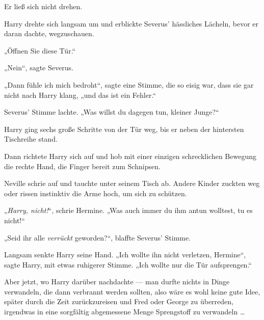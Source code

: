 Er ließ sich nicht drehen.

Harry drehte sich langsam um und erblickte Severus’ hässliches Lächeln, bevor er daran dachte, wegzuschauen.

„Öffnen Sie diese Tür.“

„Nein“, sagte Severus.

„Dann fühle ich mich bedroht“, sagte eine Stimme, die so eisig war, dass sie gar nicht nach Harry klang, „und das ist ein Fehler.“

Severus’ Stimme lachte.
„Was willst du dagegen tun, kleiner Junge?“

Harry ging sechs große Schritte von der Tür weg, bis er neben der hintersten Tischreihe stand.

Dann richtete Harry sich auf und hob mit einer einzigen schrecklichen Bewegung die rechte Hand, die Finger bereit zum Schnipsen.

Neville schrie auf und tauchte unter seinem Tisch ab. Andere Kinder zuckten weg oder rissen instinktiv die Arme hoch, um sich zu schützen.

„\emph{Harry, nicht!}“, schrie Hermine.
„Was auch immer du ihm antun wolltest, tu es nicht!“

„Seid ihr alle \emph{verrückt} geworden?“, blaffte Severus’ Stimme.

Langsam senkte Harry seine Hand.
„Ich wollte ihn nicht verletzen, Hermine“, sagte Harry, mit etwas ruhigerer Stimme.
„Ich wollte nur die Tür aufsprengen.“

Aber jetzt, wo Harry darüber nachdachte — man durfte nichts in Dinge verwandeln, die dann verbrannt werden sollten, also wäre es wohl keine gute Idee, später durch die Zeit zurückzureisen und Fred oder George zu überreden, irgendwas in eine sorgfältig abgemessene Menge Sprengstoff zu verwandeln …

